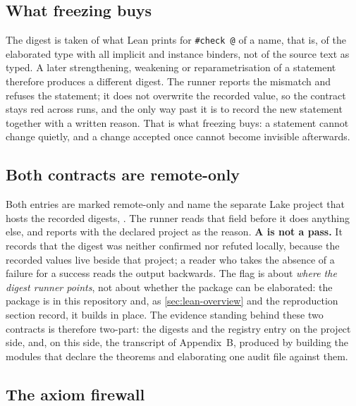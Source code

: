 \subsection{What freezing buys}

The digest is taken of what Lean prints for \texttt{\#check @} of a name, that
is, of the elaborated type with all implicit and instance binders, not of the
source text as typed. A later strengthening, weakening or reparametrisation of a
statement therefore produces a different digest. The runner reports the mismatch
and refuses the statement; it does not overwrite the recorded value, so the
contract stays red across runs, and the only way past it is to record the new
statement together with a written reason. That is what freezing buys: a
statement cannot change quietly, and a change accepted once cannot become
invisible afterwards.

\subsection{Both contracts are remote-only}

Both entries are marked remote-only and name the separate Lake project that hosts
the recorded digests, . The
runner reads that field before it does anything else, and reports  with
the declared project as the reason. \textbf{A  is not a pass.} It
records that the digest was neither confirmed nor refuted locally, because the
recorded values live beside that project; a reader who takes the absence of a
failure for a success reads the output backwards. The flag is about \emph{where
the digest runner points}, not about whether the package can be elaborated: the
package is in this repository and, as \cref{sec:lean-overview} and the
reproduction section record, it builds in place. The evidence standing behind
these two contracts is therefore two-part: the digests and the registry entry on
the project side, and, on this side, the transcript of Appendix~B, produced by
building the modules that declare the \NumChainTheorems{} theorems and elaborating one audit file
against them.


\subsection{The axiom firewall}

